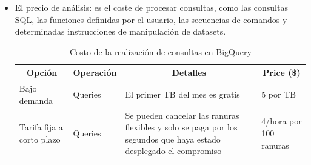 \documentclass[12pt,a4paper,openright]{article}
\begin{document}
\begin{itemize}
    \item El precio de análisis: es el coste de procesar consultas, como las consultas SQL, las funciones definidas por el usuario, las secuencias de comandos y determinadas instrucciones de manipulación de datasets.
    
    \begin{table}[ht]
    \begin{adjustbox}{width=\textwidth}
\begin{tabular}{|l|l|p{5cm}|l|}
\hline
\multicolumn{1}{|c|}{\textbf{Opción}} & \multicolumn{1}{c|}{\textbf{Operación}} & \multicolumn{1}{c|}{\textbf{Detalles}}                                                                            & \multicolumn{1}{c|}{\textbf{Price (\$)}} \\ \hline
Bajo demanda                          & Queries                      & El primer TB del mes es gratis                                                                                    & 5 por TB                                 \\ \hline
Tarifa fija a corto plazo             & Queries                      & Se pueden cancelar las ranuras flexibles y solo se paga por los segundos que haya estado desplegado el compromiso & 4/hora por 100 ranuras                   \\ \hline
\end{tabular}
\end{adjustbox}
\caption{Costo de la realizaci\'on de consultas en BigQuery}
\end{table}


\end{itemize}
\end{document}
